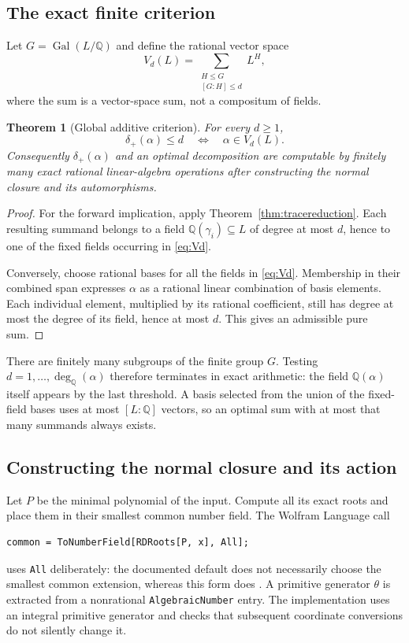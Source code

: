 \documentclass[11pt,letterpaper]{article}
\newtheorem{theorem}{Theorem}[section]
\theoremstyle{definition}
\newcommand{\Q}{\mathbb Q}
\newcommand{\Gal}{\operatorname{Gal}}
\newcommand{\dq}{\deg_{\Q}}
\newcommand{\dplus}{\delta_{+}}
\newcommand{\code}[1]{\texttt{#1}}
\begin{document}
\subsection{The exact finite criterion}
Let $G=\Gal(L/\Q)$ and define the rational vector space
\begin{equation}\label{eq:Vd}
 V_d(L)=\sum_{\substack{H\le G\\{}[G:H]\le d}}L^H,
\end{equation}
where the sum is a vector-space sum, not a compositum of fields.
\begin{samepage}
\begin{theorem}[Global additive criterion]\label{thm:additivecriterion}
For every $d\ge1$,
\[
 \dplus(\alpha)\le d\quad\Longleftrightarrow\quad \alpha\in V_d(L).
\]
Consequently $\dplus(\alpha)$ and an optimal decomposition are computable by finitely many exact rational linear-algebra operations after constructing the normal closure and its automorphisms.
\end{theorem}
\end{samepage}
\begin{proof}
For the forward implication, apply Theorem~\ref{thm:tracereduction}. Each resulting summand belongs to a field $\Q(\gamma_i)\subseteq L$ of degree at most $d$, hence to one of the fixed fields occurring in \eqref{eq:Vd}.

Conversely, choose rational bases for all the fields in \eqref{eq:Vd}. Membership in their combined span expresses $\alpha$ as a rational linear combination of basis elements. Each individual element, multiplied by its rational coefficient, still has degree at most the degree of its field, hence at most $d$. This gives an admissible pure sum.
\end{proof}
There are finitely many subgroups of the finite group $G$. Testing $d=1,\ldots,\dq(\alpha)$ therefore terminates in exact arithmetic: the field $\Q(\alpha)$ itself appears by the last threshold. A basis selected from the union of the fixed-field bases uses at most $[L:\Q]$ vectors, so an optimal sum with at most that many summands always exists.

\subsection{Constructing the normal closure and its action}
Let $P$ be the minimal polynomial of the input. Compute all its exact roots and place them in their smallest common number field. The Wolfram Language call
\begin{samepage}
\begin{lstlisting}
common = ToNumberField[RDRoots[P, x], All];
\end{lstlisting}
\end{samepage}
uses \code{All} deliberately: the documented default does not necessarily choose the smallest common extension, whereas this form does \cite{tonumberfield}. A primitive generator $\theta$ is extracted from a nonrational \code{AlgebraicNumber} entry. The implementation uses an integral primitive generator and checks that subsequent coordinate conversions do not silently change it.
\end{document}
